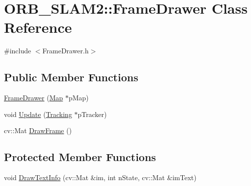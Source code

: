 \hypertarget{class_o_r_b___s_l_a_m2_1_1_frame_drawer}{}\section{O\+R\+B\+\_\+\+S\+L\+A\+M2\+:\+:Frame\+Drawer Class Reference}
\label{class_o_r_b___s_l_a_m2_1_1_frame_drawer}


{\ttfamily \#include $<$Frame\+Drawer.\+h$>$}

\subsection*{Public Member Functions}
\begin{DoxyCompactItemize}
\item 
\mbox{\hyperlink{class_o_r_b___s_l_a_m2_1_1_frame_drawer_add0e1c3734c200a959d8ed9f225223db}{Frame\+Drawer}} (\mbox{\hyperlink{class_o_r_b___s_l_a_m2_1_1_map}{Map}} $\ast$p\+Map)
\item 
void \mbox{\hyperlink{class_o_r_b___s_l_a_m2_1_1_frame_drawer_ad1bba97371be98ccab373bab862cf964}{Update}} (\mbox{\hyperlink{class_o_r_b___s_l_a_m2_1_1_tracking}{Tracking}} $\ast$p\+Tracker)
\item 
cv\+::\+Mat \mbox{\hyperlink{class_o_r_b___s_l_a_m2_1_1_frame_drawer_a7d2b0099c169f6944cadc2cd574a06de}{Draw\+Frame}} ()
\end{DoxyCompactItemize}
\subsection*{Protected Member Functions}
\begin{DoxyCompactItemize}
\item 
void \mbox{\hyperlink{class_o_r_b___s_l_a_m2_1_1_frame_drawer_a059f66cfb0702264c788a79313ec3630}{Draw\+Text\+Info}} (cv\+::\+Mat \&im, int n\+State, cv\+::\+Mat \&im\+Text)
\end{DoxyCompactItemize}
